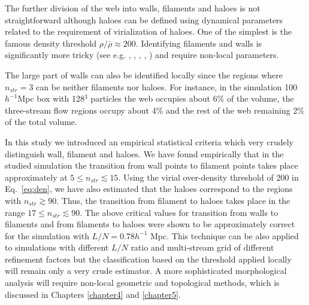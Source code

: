    
 The further division of the web into walls, filaments and haloes is not straightforward although haloes can be defined using dynamical parameters
 related to the requirement of virialization of haloes. One of the simplest is the famous density threshold $\rho/\bar{\rho} \approx 200$. 
 Identifying filaments and walls is significantly more tricky (see e.g. \citealt{Hahn2007}, \citealt{Forero-Romero2009a}, 
  \citealt{Aragon-Calvo2010a}, \citealt{Cautun2014a}, \citealt{Falck2015}) and require non-local parameters.
  
The large part of walls can also be identified locally since the regions where $n_{str} = 3$ can be neither filaments nor haloes. 
For instance, in the simulation  100  $h^{-1}$Mpc box with 128$^3$  particles the web occupies about 6\% of the volume, the three-stream flow
regions occupy about 4\% and the rest of the web remaining 2\% of the total volume.

In this study we introduced an empirical statistical criteria which very crudely distinguish wall, filament and haloes. %
We have found empirically that  in  the studied simulation the transition from wall points to filament points takes place approximately at $ 5 \le n_{str} \lesssim 15$. Using the virial over-density threshold of 200 in Eq.~\ref{eq:den}, we have also estimated that the haloes correspond to the regions with $n_{str} \gtrsim 90$.
Thus, the transition from filament to haloes takes place in the range $ 17 \le n_{str} \lesssim 90$.
The above critical values for transition from walls to filaments and from filaments to haloes were shown to be approximately correct
for  the simulation with $L/N = 0.78 h^{-1}$ Mpc. This technique can be also applied to simulations with different $L/N$ ratio and multi-stream grid of different refinement factors but the classification based on the threshold applied locally will remain only a very crude estimator. A more sophisticated morphological analysis will require non-local geometric and topological methods, which is discussed in Chapters \ref{chapter4} and \ref{chapter5}.  
 
